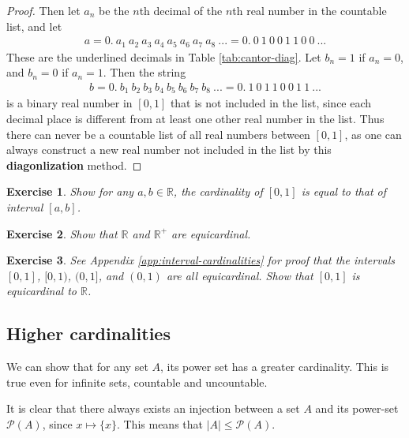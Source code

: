 \documentclass{article}[12pt]
\newtheorem{exercise}{Exercise}
\newcommand{\R}{\mathbb{R}}
\newcommand{\PS}{\mathcal{P}}
\begin{document}
\begin{proof}
            Then let $a_n$ be the $n$th decimal of the $n$th real number in the countable list, and let
            \begin{align}
                a
                = 0.\ a_1\ a_2\ a_3\ a_4\ a_5\ a_6\ a_7\ a_8\ ...
                = 0.\ 0\ 1\ 0\ 0\ 1\ 1\ 0\ 0\ ...
            \end{align}
            These are the underlined decimals in Table \ref{tab:cantor-diag}. Let $b_n = 1$ if $a_n = 0$, and $b_n = 0$ if $a_n = 1$. Then the string
            \begin{align}
                b
                = 0.\ b_1\ b_2\ b_3\ b_4\ b_5\ b_6\ b_7\ b_8\ ...
                = 0.\ 1\ 0\ 1\ 1\ 0\ 0\ 1\ 1\ ...
            \end{align}
            is a binary real number in $[0, 1]$ that is not included in the list, since each decimal place
            is different from at least one other real number in the list. Thus there can never be a countable list of all real numbers between $[0, 1]$, as one can always construct a new real number not included in the list by this \textbf{diagonlization} method.
        \end{proof}
        
        \begin{exercise}
            Show for any $a, b \in \R$, the cardinality of $[0, 1]$ is equal to that of interval $[a, b]$.
        \end{exercise}
        
        \begin{exercise}
            Show that $\R$ and $\R^+$ are equicardinal.
        \end{exercise}
        
        \begin{exercise}
            See Appendix \eqref{app:interval-cardinalities} for proof that the intervals $[0, 1]$, $[0, 1)$, $(0, 1]$, and $(0, 1)$ are all equicardinal. Show that $[0, 1]$ is equicardinal to $\R$.
        \end{exercise}

    \subsection{Higher cardinalities}
    
        We can show that for any set $A$, its power set has a greater cardinality. This is true even for infinite sets, countable and uncountable.
        
        It is clear that there always exists an injection between a set $A$ and its power-set $\PS(A)$, since $x \mapsto \{x\}$. This means that $|A| \le \PS(A)$.
        
\end{document}
